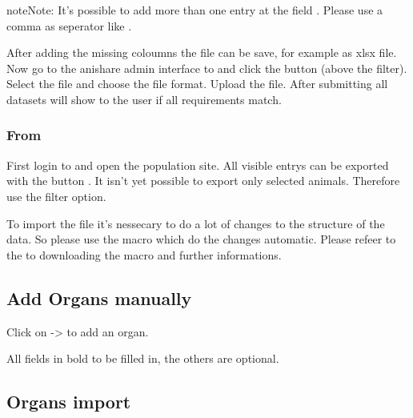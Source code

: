 \documentclass[letterpaper,10pt,openany,oneside,english]{sphinxmanual}
\begin{document}
\begin{sphinxadmonition}{note}{Note:}
It’s possible to add more than one entry at the field . Please use a comma as seperator like .
\end{sphinxadmonition}

After adding the missing coloumns the file can be save, for example as xlsx file. Now go to the anishare admin interface to 
and click the button  (above the filter). Select the file and choose the file format. Upload the file. After submitting all datasets will show to
the user if all requirements match.


\subsubsection{From }
\label{\detokenize{index:from-tick-lab}}
First login to  and open the population site. All visible entrys can be exported with the button . It isn’t yet possible to export
only selected animals. Therefore use the filter option.

\noindent{}

To import the file it’s nessecary to do a lot of changes to the structure of the data. So please use the macro which do the changes automatic.
Please refeer to the  to downloading the macro and further informations.


\subsection{Add Organs manually}
\label{\detokenize{index:add-organs-manually}}
Click on  -\textgreater{}  to add an organ.

\noindent{}

All fields in bold  to be filled in, the others are optional.


\subsection{Organs import}
\label{\detokenize{index:organs-import}}
\end{document}

